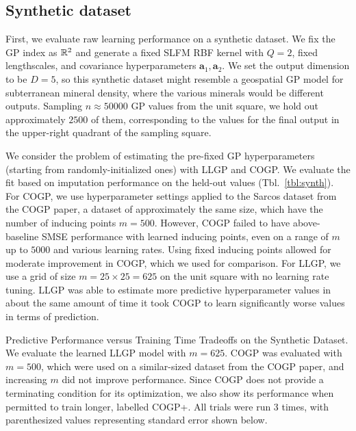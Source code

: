 \documentclass[twoside]{article}
\begin{document}
\subsection{Synthetic dataset}\label{synth-bench}

First, we evaluate raw learning performance on a synthetic dataset. We fix the GP index as $\mathbb{R}^2$ and generate a fixed SLFM RBF kernel with $Q=2$, fixed lengthscales, and covariance hyperparameters $\textbf{a}_1,\textbf{a}_2$. We set the output dimension to be $D=5$, so this synthetic dataset might resemble a geospatial GP model for subterranean mineral density, where the various minerals would be different outputs. Sampling $n\approx 50000$ GP values from the unit square, we hold out approximately $2500$ of them, corresponding to the values for the final output in the upper-right quadrant of the sampling square.

We consider the problem of estimating the pre-fixed GP hyperparameters (starting from randomly-initialized ones) with LLGP and COGP. We evaluate the fit based on imputation performance on the held-out values (Tbl.~\ref{tbl:synth}). For COGP, we use hyperparameter settings applied to the Sarcos dataset from the COGP paper, a dataset of approximately the same size, which have the number of inducing points $m=500$. However, COGP failed to have above-baseline SMSE performance with learned inducing points, even on a range of $m$ up to $5000$ and various learning rates. Using fixed inducing points allowed for moderate improvement in COGP, which we used for comparison. For LLGP, we use a grid of size $m=25\times 25=625$ on the unit square with no learning rate tuning. LLGP was able to estimate more predictive hyperparameter values in about the same amount of time it took COGP to learn significantly worse values in terms of prediction.

\begin{table}[!ht]
\caption{Predictive Performance versus Training Time Tradeoffs on the Synthetic Dataset. We evaluate the learned LLGP model with $m=625$. COGP was evaluated with $m=500$, which were used on a similar-sized dataset from the COGP paper, and increasing $m$ did not improve performance. Since COGP does not provide a terminating condition for its optimization, we also show its performance when permitted to train longer, labelled COGP+. All trials were run 3 times, with parenthesized values representing standard error shown below.}
\label{tbl:synth}
\begin{center}
  \begin{small}
    \begin{sc}

\end{sc}
\end{small}
\end{center}

\end{table}
\end{document}
